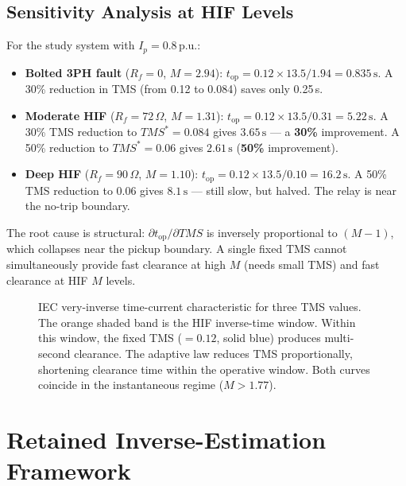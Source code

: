\documentclass[10pt,journal,twoside]{IEEEtran}
\newcommand{\pu}{\,\text{p.u.}}
\newcommand{\sss}{\,\text{s}}
\newcommand{\Rf}{R_{\!f}}
\newcommand{\tms}{TMS}
\newcommand{\tmss}{TMS^*}
\begin{document}
\subsection{Sensitivity Analysis at HIF Levels}
\label{sec:baseline:sensitivity}

For the study system with $I_p = 0.8\pu$:
\begin{itemize}
  \item \textbf{Bolted 3PH fault} ($\Rf = 0$, $M = 2.94$):
        $t_{\mathrm{op}} = 0.12 \times 13.5/1.94 = 0.835\sss$.
        A 30\% reduction in TMS (from 0.12 to 0.084) saves only 0.25\,s.

  \item \textbf{Moderate HIF} ($\Rf = 72\,\Omega$, $M = 1.31$):
        $t_{\mathrm{op}} = 0.12 \times 13.5/0.31 = 5.22\sss$.
        A 30\% TMS reduction to $\tmss = 0.084$ gives $3.65\sss$ --- a
        \textbf{30\%} improvement.  A 50\% reduction to $\tmss = 0.06$
        gives $2.61\sss$ (\textbf{50\%} improvement).

  \item \textbf{Deep HIF} ($\Rf = 90\,\Omega$, $M = 1.10$):
        $t_{\mathrm{op}} = 0.12 \times 13.5/0.10 = 16.2\sss$.
        A 50\% TMS reduction to 0.06 gives $8.1\sss$ --- still slow, but
        halved.  The relay is near the no-trip boundary.
\end{itemize}

\noindent
The root cause is structural: $\partial t_{\mathrm{op}}/\partial\tms$ is
inversely proportional to $(M-1)$, which collapses near the pickup boundary.
A single fixed TMS cannot simultaneously provide fast clearance at high $M$
(needs small TMS) and fast clearance at HIF $M$ levels.

\begin{figure}[!t]
\centering

\caption{IEC very-inverse time-current characteristic for three TMS values.
  The orange shaded band is the HIF inverse-time window.
  Within this window, the fixed TMS ($= 0.12$, solid blue) produces
  multi-second clearance.  The adaptive law reduces TMS proportionally,
  shortening clearance time within the operative window.
  Both curves coincide in the instantaneous regime ($M > 1.77$).}
\label{fig:vi_curves}
\end{figure}

\section{Retained Inverse-Estimation Framework}
\label{sec:estimation}
\end{document}
